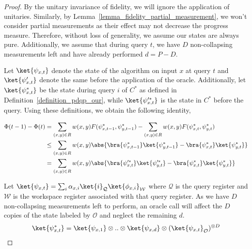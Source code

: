 \documentclass[10pt,a4paper]{article}
\begin{document}
\begin{proof}
    By the unitary invariance of fidelity, we will ignore the application of unitaries. Similarly, by Lemma~\ref{lemma_fidelity_partial_measurement}, we won't consider partial measurements as their effect may not decrease the progress measure. Therefore, without loss of generality, we assume our states are always pure. Additionally, we assume that during query $t$, we have $D$ non-collapsing measurements left and have already performed $d=P-D$.

    Let $\ket{\psi_{x,t}}$ denote the state of the algorithm on input $x$ at query $t$ and $\ket{\psi_{x,t}^\prime}$ denote the same before the application of the oracle. Additionally, let $\ket{\psi_{x,t}^*}$ be the state during query $i$ of $C^*$ as defined in Definition~\ref{definition_pdqp_our}, while $\ket{\psi_{x,t}^{\prime *}}$ is the state in $C^*$ before the query. Using these definitions, we obtain the following identity,

    \begin{align}
        \Phi(t-1) - \Phi(t) &= \sum_{(x,y)\in R} w(x,y) F( \psi_{x, t-1}^*,\psi_{y, t-1}^* ) - \sum_{(x,y)\in R} w(x,y) F(\psi_{x, t}^*,\psi_{y, t}^* )\\
        & \leq \sum_{(x,y)\in R} w(x,y) \abs{ \bra{\psi_{x,t-1}^*}\ket{\psi_{y,t-1}^*}  -  \bra{\psi_{x,t}^*}\ket{\psi_{y,t}^*}}\\ 
        &= \sum_{(x,y)\in R} w(x,y) \abs{\bra{\psi_{x,t}^{\prime *}}\ket{\psi_{y,t}^{\prime *}}  - \bra{\psi_{x,t}^*}\ket{\psi_{y,t}^*}} \label{eq_progress_simplification}
    \end{align}
    
    Let $\ket{\psi_{x,t}} = \sum_{i} \alpha_{x,i} \ket{i}_\mathcal{Q}\ket{\phi_{x,i}}_\mathcal{W}$ where $\mathcal{Q}$ is the query register and $\mathcal{W}$ is the workspace register associated with that query register. As we have $D$ non-collapsing measurements left to perform, an oracle call will affect the $D$ copies of the state labeled by $\mathcal{O}$ and neglect the remaining $d$.
    \begin{align*}
        \ket{\psi_{x,t}^*} = \ket{\psi_{x,1}}\otimes..\otimes\ket{\psi_{x,d}}\otimes (\ket{\psi_{x,t}}_\mathcal{O})^{\otimes D}
    \end{align*}


\end{proof}
\end{document}
